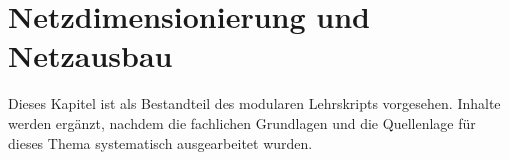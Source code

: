 \chapter{Netzdimensionierung und Netzausbau}
\label{chap:19-netzdimensionierung}

Dieses Kapitel ist als Bestandteil des modularen Lehrskripts vorgesehen.
Inhalte werden ergänzt, nachdem die fachlichen Grundlagen und die
Quellenlage für dieses Thema systematisch ausgearbeitet wurden.
